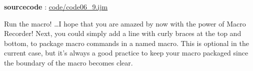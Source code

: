 \textbf{sourcecode} : \href{http://www.example.com/contents}{code/code06\_9.ijm}

Run the macro! \ldots I hope that you are amazed by now with the power of Macro
Recorder! Next, you could simply add a line with curly braces at the top and bottom, to package macro commands in a named macro. This is optional in the current case, but it's always a good practice to keep your macro packaged since the boundary of the macro becomes clear.